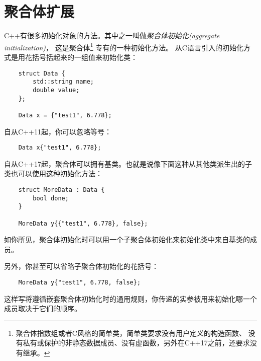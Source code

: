 \chapter{聚合体扩展}\label{ch4}
C++有很多初始化对象的方法。其中之一叫做\emph{聚合体初始化(aggregate initialization)}，
这是聚合体\footnote{聚合体指数组或者C风格的简单类，简单类要求没有用户定义的构造函数、
没有私有或保护的非静态数据成员、没有虚函数，另外在C++17之前，还要求没有继承。}
专有的一种初始化方法。
从C语言引入的初始化方式是用花括号括起来的一组值来初始化类：
\begin{lstlisting}
    struct Data {
        std::string name;
        double value;
    };

    Data x = {"test1", 6.778};
\end{lstlisting}
自从C++11起，你可以忽略等号：
\begin{lstlisting}
    Data x{"test1", 6.778};
\end{lstlisting}
自从C++17起，聚合体可以拥有基类。也就是说像下面这种从其他类派生出的子类也可以使用这种初始化方法：
\begin{lstlisting}
    struct MoreData : Data {
        bool done;
    }

    MoreData y{{"test1", 6.778}, false};
\end{lstlisting}
如你所见，聚合体初始化时可以用一个子聚合体初始化来初始化类中来自基类的成员。

另外，你甚至可以省略子聚合体初始化的花括号：
\begin{lstlisting}
    MoreData y{"test1", 6.778, false};
\end{lstlisting}
这样写将遵循嵌套聚合体初始化时的通用规则，你传递的实参被用来初始化哪一个成员取决于它们的顺序。

